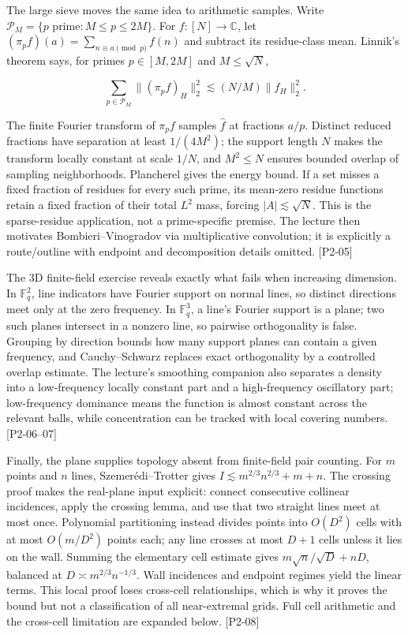 The large sieve moves the same idea to arithmetic samples. Write \(\mathcal P_M=\{p\text{ prime}:M\le p\le2M\}\). For \(f:[N]\to\mathbb C\), let \((\pi_pf)(a)=\sum_{n\equiv a\pmod p}f(n)\) and subtract its residue-class mean. Linnik's theorem says, for primes \(p\in[M,2M]\) and \(M\le\sqrt N\),

\[\sum_{p\in\mathcal P_M}\|(\pi_pf)_H\|_2^2\lesssim(N/M)\|f_H\|_2^2.\]

The finite Fourier transform of \(\pi_pf\) samples \(\widehat f\) at fractions \(a/p\). Distinct reduced fractions have separation at least \(1/(4M^2)\); the support length \(N\) makes the transform locally constant at scale \(1/N\), and \(M^2\le N\) ensures bounded overlap of sampling neighborhoods. Plancherel gives the energy bound. If a set misses a fixed fraction of residues for every such prime, its mean-zero residue functions retain a fixed fraction of their total \(L^2\) mass, forcing \(|A|\lesssim\sqrt N\). This is the sparse-residue application, not a prime-specific premise. The lecture then motivates Bombieri--Vinogradov via multiplicative convolution; it is explicitly a route/outline with endpoint and decomposition details omitted. {[}P2-05{]}

The 3D finite-field exercise reveals exactly what fails when increasing dimension. In \(\mathbb F_q^2\), line indicators have Fourier support on normal lines, so distinct directions meet only at the zero frequency. In \(\mathbb F_q^3\), a line's Fourier support is a plane; two such planes intersect in a nonzero line, so pairwise orthogonality is false. Grouping by direction bounds how many support planes can contain a given frequency, and Cauchy--Schwarz replaces exact orthogonality by a controlled overlap estimate. The lecture's smoothing companion also separates a density into a low-frequency locally constant part and a high-frequency oscillatory part; low-frequency dominance means the function is almost constant across the relevant balls, while concentration can be tracked with local covering numbers. {[}P2-06--07{]}

Finally, the plane supplies topology absent from finite-field pair counting. For \(m\) points and \(n\) lines, Szemerédi--Trotter gives \(I\lesssim m^{2/3}n^{2/3}+m+n\). The crossing proof makes the real-plane input explicit: connect consecutive collinear incidences, apply the crossing lemma, and use that two straight lines meet at most once. Polynomial partitioning instead divides points into \(O(D^2)\) cells with at most \(O(m/D^2)\) points each; any line crosses at most \(D+1\) cells unless it lies on the wall. Summing the elementary cell estimate gives \(m\sqrt n/\sqrt D+nD\), balanced at \(D\asymp m^{2/3}n^{-1/3}\). Wall incidences and endpoint regimes yield the linear terms. This local proof loses cross-cell relationships, which is why it proves the bound but not a classification of all near-extremal grids. Full cell arithmetic and the cross-cell limitation are expanded below. {[}P2-08{]}

